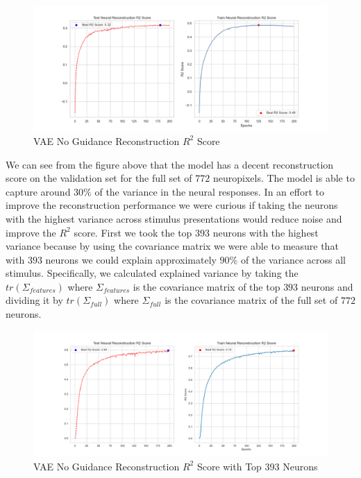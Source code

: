 \documentclass[12pt, letterpaper]{article}
\begin{document}
\begin{figure}[H]
    \centering
    \includegraphics[width=1.0\textwidth]{x_r2_128dim_200_epochs_0.05beta_2_layer.png}
    \caption{VAE No Guidance Reconstruction $R^2$ Score}
    \label{fig:vae_no_guidance}
\end{figure}

We can see from the figure above that the model has a decent reconstruction score on the validation set for the full set of $772$ neuropixels. The model is able to capture around $30\%$ of the variance in the neural responses. In an effort to improve the reconstruction performance we were curious if taking the neurons with the highest variance across stimulus presentations would reduce noise and improve the $R^2$ score. First we took the top $393$ neurons with the highest variance because by using the covariance matrix we were able to measure that with $393$ neurons we could explain approximately $90\%$ of the variance across all stimulus. Specifically, we calculated explained variance by taking the $tr(\Sigma_{features})$ where $\Sigma_{features}$ is the covariance matrix of the top $393$ neurons and dividing it by $tr(\Sigma_{full})$ where $\Sigma_{full}$ is the covariance matrix of the full set of $772$ neurons. 

\begin{figure}[H]
    \centering
    \includegraphics[width=1.0\textwidth]{x_r2_128dim_393_top_var_200_epochs_0.05_beta_2_layer.png}
    \caption{VAE No Guidance Reconstruction $R^2$ Score with Top 393 Neurons}
    \label{fig:vae_no_guidance_top393}
\end{figure}
\end{document}
